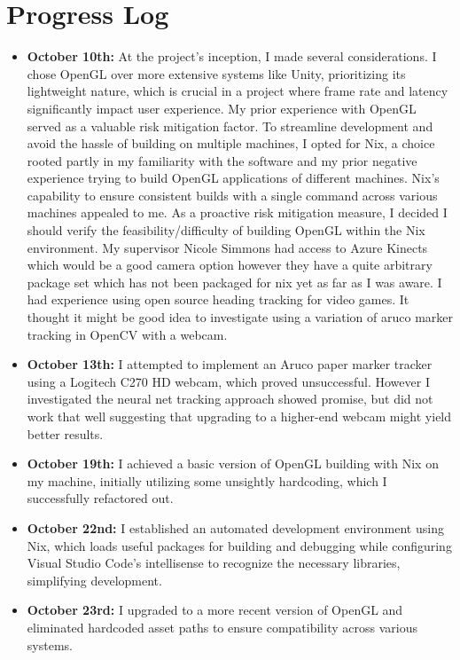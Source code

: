\section{Progress Log}
\begin{itemize}
    \item \textbf{October 10th:} At the project's inception, I made several considerations. I chose OpenGL over more extensive systems like Unity, prioritizing its lightweight nature, which is crucial in a project where frame rate and latency significantly impact user experience. My prior experience with OpenGL served as a valuable risk mitigation factor. To streamline development and avoid the hassle of building on multiple machines, I opted for Nix, a choice rooted partly in my familiarity with the software and my prior negative experience trying to build OpenGL applications of different machines. Nix's capability to ensure consistent builds with a single command across various machines appealed to me. As a proactive risk mitigation measure, I decided I should verify the feasibility/difficulty of building OpenGL within the Nix environment. My supervisor Nicole Simmons had access to Azure Kinects which would be a good camera option however they have a quite arbitrary package set which has not been packaged for nix yet as far as I was aware. I had experience using open source heading tracking for video games. It thought it might be good idea to investigate using a variation of aruco marker
          tracking in OpenCV with a webcam.

    \item \textbf{October 13th:} I attempted to implement an Aruco paper marker tracker using a Logitech C270 HD webcam, which proved unsuccessful. However I investigated the neural net tracking approach showed promise, but did not work that well  suggesting that upgrading to a higher-end webcam might yield better results.

    \item \textbf{October 19th:} I achieved a basic version of OpenGL building with Nix on my machine, initially utilizing some unsightly hardcoding, which I successfully refactored out.

    \item \textbf{October 22nd:} I established an automated development environment using Nix, which loads useful packages for building and debugging while configuring Visual Studio Code's intellisense to recognize the necessary libraries, simplifying development.

    \item \textbf{October 23rd:} I upgraded to a more recent version of OpenGL and eliminated hardcoded asset paths to ensure compatibility across various systems.


\end{itemize}
